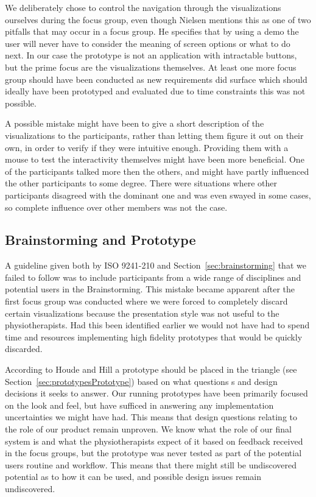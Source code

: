 We deliberately chose to control the navigation through the visualizations ourselves during the focus group, even though Nielsen mentions this as one of two pitfalls that may occur in a focus group. He specifies that by using a demo the user will never have to consider the meaning of screen options or what to do next. In our case the prototype is not an application with intractable buttons, but the prime focus are the visualizations themselves. At least one more focus group should have been conducted as new requirements did surface which should ideally have been prototyped and evaluated due to time constraints this was not possible.

A possible mistake might have been to give a short description of the visualizations to the participants, rather than letting them figure it out on their own, in order to verify if they were intuitive enough. Providing them with a mouse to test the interactivity themselves might have been more beneficial. One of the participants talked more then the others, and might have partly influenced the other participants to some degree. There were situations where other participants disagreed with the dominant one and was even swayed in some cases, so complete influence over other members was not the case.

\subsection{Brainstorming and Prototype}
A guideline given both by ISO 9241-210 and Section~\ref{sec:brainstorming} that we failed to follow was to include participants from a wide range of disciplines and potential users in the Brainstorming. This mistake became apparent after the first focus group was conducted where we were forced to completely discard certain visualizations because the presentation style was not useful to the physiotherapists. Had this been identified earlier we would not have had to spend time and resources implementing high fidelity prototypes that would be quickly discarded.

According to Houde and Hill a prototype should be placed in the triangle (see Section~\ref{sec:prototypesPrototype}) based on what questions s and design decisions it seeks to answer. Our running prototypes have been primarily focused on the look and feel, but have sufficed in answering any implementation uncertainties we might have had. This means that design questions relating to the role of our product remain unproven. We know what the role of our final system is and what the physiotherapists expect of it based on feedback received in the focus groups, but the prototype was never tested as part of the potential users routine and workflow. This means that there might still be undiscovered potential as to how it can be used, and possible design issues remain undiscovered.

